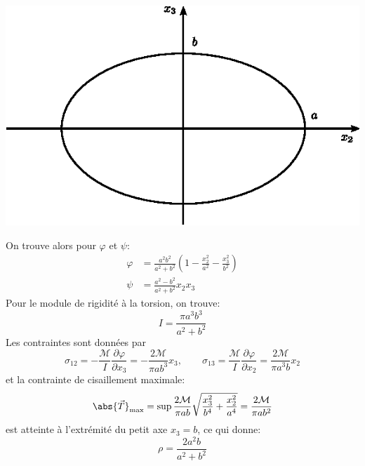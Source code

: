 \begin{center}
        \includegraphics{../images/T1_Ch07-16}
    \end{center}


On trouve alors pour $\varphi$ et $\psi$:
\begin{align}
    \varphi &= \frac{a^2 b^2}{a^2 + b^2} \left(1-\frac{x_2^2}{a^2}-\frac{x_3^2}{b^2} \right) \label{eq:Ch07-082}\\
    \psi &= \frac{a^2 - b^2}{a^2 + b^2} x_2 x_3 \label{eq:Ch07-083}
\end{align}
Pour le module de rigidité à la torsion, on trouve:
\begin{equation}
    I = \frac{\pi a^3 b^3}{a^2 + b^2}
    \label{eq:Ch07-084}
\end{equation}
Les contraintes sont données par
\begin{equation}
        \sigma_{12} = - \frac{\mathcal{M}}{I} \frac{\partial \varphi}{\partial x_3} = - \frac{2 \mathcal{M}}{\pi a b^3} x_3 ,\qquad
        \sigma_{13} = \frac{\mathcal{M}}{I}\frac{\partial \varphi}{\partial x_2} = \frac{2 \mathcal{M}}{\pi a^3 b} x_2
    \label{eq:Ch07-085}
\end{equation}
et la contrainte de cisaillement maximale:
\begin{equation}
    \abs{\vec{T}}_{\text{max}} = \sup \frac{2\mathcal{M}}{\pi a b} \sqrt{\frac{x_3^2}{b^4} + \frac{x_2^2}{a^4}} = \frac{2\mathcal{M}}{\pi a b^2}
    \label{eq:Ch07-086}
\end{equation}
est atteinte à l'extrémité du petit axe $x_3 = b$, ce qui donne: 
\begin{equation}
    \rho = \frac{2 a^2 b}{a^2 + b^2}
    \label{eq:Ch07-087}
\end{equation}
